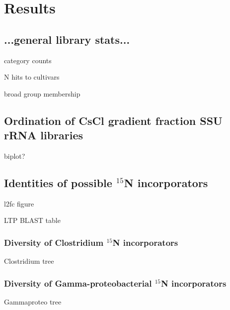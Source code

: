 \section{Results}

\subsection{...general library stats...}

category counts

N hits to cultivars

broad group membership

\subsection{Ordination of CsCl gradient fraction SSU rRNA libraries}

biplot?

\subsection{Identities of possible $^{15}$N incorporators}

l2fc figure

LTP BLAST table

\subsubsection{Diversity of Clostridium $^{15}$N incorporators}

Clostridium tree

\subsubsection{Diversity of Gamma-proteobacterial $^{15}$N incorporators}

Gammaproteo tree



